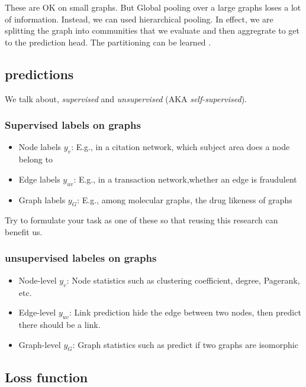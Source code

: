 \documentclass{article}
\begin{document}
These are OK on small graphs. But Global pooling over a large graphs loses a lot of information. Instead, we can used hierarchical pooling. 
In effect, we are splitting the graph into communities that we evaluate and then aggregrate to get to the prediction head. The partitioning can be learned \cite{DiffPool}.

\subsection{predictions}

We talk about, \emph{supervised} and \emph{unsupervised} (AKA \emph{self-supervised}).

\subsubsection{Supervised labels on graphs}

\begin{itemize}
    \item Node labels $y_v$: E.g., in a citation network, which subject area does a node belong to
    \item Edge labels $y_{uv}$: E.g., in a transaction network,whether an edge is fraudulent
    \item Graph labels $y_G$: E.g., among molecular graphs, the drug likeness of graphs
\end{itemize}

Try to formulate your task as one of these so that reusing this research can benefit us.

\subsubsection{unsupervised labeles on graphs}

\begin{itemize}
    \item Node-level $y_v$: Node statistics such as clustering coefficient, degree, Pagerank, etc.
    \item Edge-level $y_{uv}$: Link prediction hide the edge between two nodes, then predict there should be a link.
    \item Graph-level $y_G$: Graph statistics such as predict if two graphs are isomorphic
\end{itemize}

\subsection{Loss function}
\end{document}

